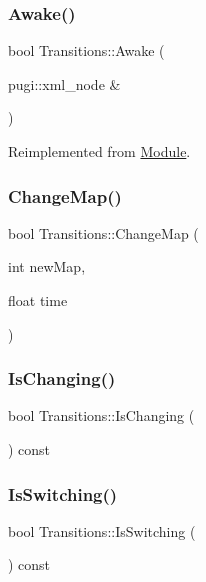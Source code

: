 \subsubsection{\texorpdfstring{Awake()}{Awake()}}
{\footnotesize\ttfamily bool Transitions\+::\+Awake (\begin{DoxyParamCaption}\item[{pugi\+::xml\+\_\+node \&}]{ }\end{DoxyParamCaption})\hspace{0.3cm}{\ttfamily [virtual]}}



Reimplemented from \mbox{\hyperlink{class_module_a4a283650cf8a73aa0b5599106bc2ba6c}{Module}}.

\mbox{\label{class_transitions_a1a4e4a4b96eaa66b89dd7cbc0fdeb32f}} 
\subsubsection{\texorpdfstring{ChangeMap()}{ChangeMap()}}
{\footnotesize\ttfamily bool Transitions\+::\+Change\+Map (\begin{DoxyParamCaption}\item[{int}]{new\+Map,  }\item[{float}]{time }\end{DoxyParamCaption})}

\mbox{\label{class_transitions_abc603bdac6ec85d49fb08049a43d97a7}} 
\subsubsection{\texorpdfstring{IsChanging()}{IsChanging()}}
{\footnotesize\ttfamily bool Transitions\+::\+Is\+Changing (\begin{DoxyParamCaption}{ }\end{DoxyParamCaption}) const}

\mbox{\label{class_transitions_ac94a8b975914bbdaaae2bdc097e252a2}} 
\subsubsection{\texorpdfstring{IsSwitching()}{IsSwitching()}}
{\footnotesize\ttfamily bool Transitions\+::\+Is\+Switching (\begin{DoxyParamCaption}{ }\end{DoxyParamCaption}) const}

